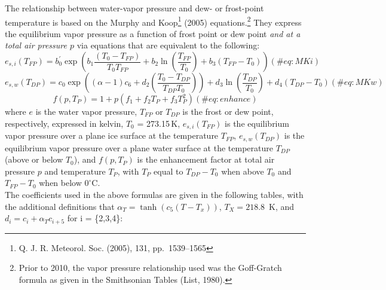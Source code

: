 \documentclass[
  english,
]{book}
\begin{document}
The relationship between water-vapor pressure and dew- or frost-point
temperature is based on the Murphy and Koop\footnote{Q. J. R. Meteorol.
  Soc. (2005), 131, pp.~1539--1565} (2005) equations.\footnote{Prior to
  2010, the vapor pressure relationship used was the Goff-Gratch formula
  as given in the Smithsonian Tables (List, 1980).} They express the
equilibrium vapor pressure as a function of frost point or dew point
\emph{and at a total air pressure \(p\)} via equations that are
equivalent to the following:\\
\begin{equation}
e_{s,i}(T_{FP})= b_{0}^{\prime}\exp(b_{1}\frac{(T_{0}-T_{FP})}{T_{0}T_{FP}}+b_{2}\ln(\frac{T_{FP}}{T_{0}})+b_{3}(T_{FP}-T_{0}))
(\#eq:MKi)
\end{equation} \begin{equation}
e_{s,w}(T_{DP})=c_{0}\exp\left((\alpha-1)c_{6}+d_{2}(\frac{T_{0}-T_{DP}}{T_{DP}T_{0}})\right)+d_{3}\ln(\frac{T_{DP}}{T_{0}})+d_{4}(T_{DP}-T_{0})
(\#eq:MKw)
\end{equation} \begin{equation}
f(p, T_P)= 1 + p(f_1 + f_2T_P + f_3T_P^2)
(\#eq:enhance)
\end{equation} where \(e\) is the water vapor pressure, \(T_{FP}\) or
\(T_{DP}\) is the frost or dew point, respectively, expressed in kelvin,
\(T_0\) = 273.15 K, \(e_{s,i}(T_{FP})\) is the equilibrium vapor
pressure over a plane ice surface at the temperature \(T_{FP}\),
\(e_{s,w}(T_{DP})\) is the equilibrium vapor pressure over a plane water
surface at the temperature \(T_{DP}\) (above or below \(T_0\)), and
\(f(p,T_P)\) is the enhancement factor at total air pressure \(p\) and
temperature \(T_P\), with \(T_P\) equal to \(T_{DP}−T_0\) when above
\(T_0\) and \(T_{FP}−T_0\) when below \(0^\circ\)C.\\
The coefficients used in the above formulas are given in the following
tables, with the additional definitions that
\(\alpha_T=\tanh(c_5(T-T_x))\), \(T_X=218.8\)~K, and
\(d_i=c_i+\alpha_Tc_{i+5}\) for i = \{2,3,4\}:
\end{document}
